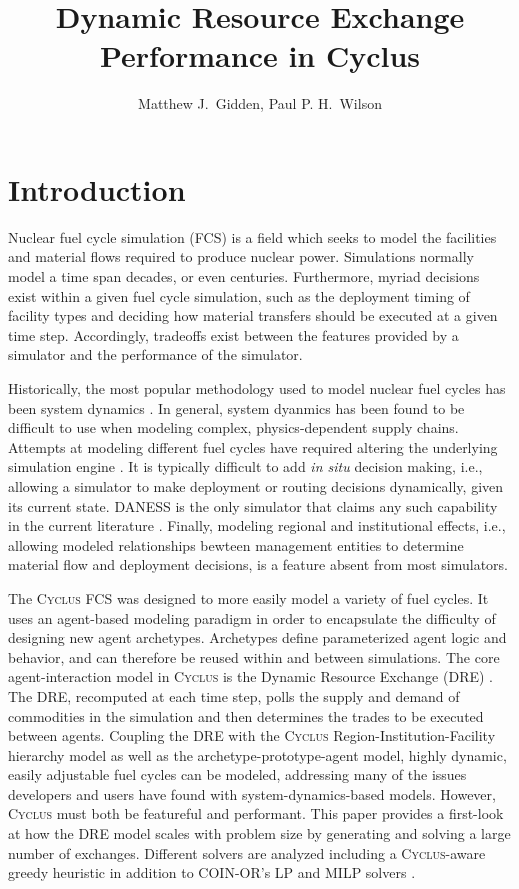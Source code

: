 \documentclass{anstrans}
\title{Dynamic Resource Exchange Performance in Cyclus}
\author{Matthew J.~Gidden, Paul P. H.~Wilson}
\institute{
University of Wisconsin, Madison WI
}
\newcommand{\Cyclus}{\textsc{Cyclus}}
\begin{document}
\section{Introduction}
Nuclear fuel cycle simulation (FCS) is a field which seeks to model the
facilities and material flows required to produce nuclear power. Simulations
normally model a time span decades, or even centuries. Furthermore, myriad
decisions exist within a given fuel cycle simulation, such as the deployment
timing of facility types and deciding how material transfers should be executed
at a given time step. Accordingly, tradeoffs exist between the features provided
by a simulator and the performance of the simulator.

Historically, the most popular methodology used to model nuclear fuel cycles has
been system dynamics \cite{moisseytsev_dymond_2001, durpel_daness_2003,
  yacout_vision_2006, busquim_e_silva_system_2008}. In general, system dyanmics
has been found to be difficult to use when modeling complex, physics-dependent
supply chains. Attempts at modeling different fuel cycles have required altering
the underlying simulation engine \cite{guerin_impact_2009}. It is typically
difficult to add \textit{in situ} decision making, i.e., allowing a simulator to
make deployment or routing decisions dynamically, given its current
state. DANESS is the only simulator that claims any such capability in the
current literature \cite{van_den_durpel_daness_2009}. Finally, modeling regional
and institutional effects, i.e., allowing modeled relationships bewteen
management entities to determine material flow and deployment decisions, is a
feature absent from most simulators. 

The \Cyclus{} FCS \cite{cyclus2014} was designed to more easily model a variety
of fuel cycles. It uses an agent-based modeling paradigm in order to encapsulate
the difficulty of designing new agent archetypes. Archetypes define
parameterized agent logic and behavior, and can therefore be reused within and
between simulations. The core agent-interaction model in \Cyclus{} is the
Dynamic Resource Exchange (DRE) \cite{gidden_agent-based_2013,
  gidden_agent-based_2014}. The DRE, recomputed at each time step, polls the
supply and demand of commodities in the simulation and then determines the
trades to be executed between agents. Coupling the DRE with the \Cyclus{}
Region-Institution-Facility hierarchy model as well as the
archetype-prototype-agent model, highly dynamic, easily adjustable fuel cycles
can be modeled, addressing many of the issues developers and users have found
with system-dynamics-based models. However, \Cyclus{} must both be featureful
and performant. This paper provides a first-look at how the DRE model scales
with problem size by generating and solving a large number of
exchanges. Different solvers are analyzed including a \Cyclus{}-aware greedy
heuristic in addition to COIN-OR's LP and MILP solvers \cite{coinclp, coincbc}.
\end{document}
